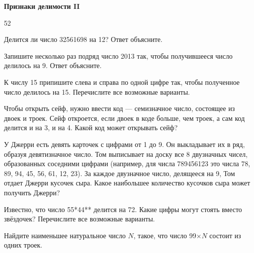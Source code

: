 \centerline{\bf \Huge Признаки делимости II}

\begin{flushright}
        \scriptsize{52}
\end{flushright}

 Делится ли число 32561698 на 12? Ответ объясните.

 Запишите несколько раз подряд число 2013 так, чтобы получившееся число делилось на 9. Ответ объясните.

 К числу 15 припишите слева и справа по одной цифре так, чтобы полученное число делилось на 15. Перечислите все возможные варианты.

 Чтобы открыть сейф, нужно ввести код — семизначное число, состоящее из двоек и троек.
Сейф откроется, если двоек в коде больше, чем троек, а сам код делится и на 3, и на 4. Какой
код может открывать сейф?

 У Джерри есть девять карточек с цифрами от 1 до 9. Он выкладывает их в ряд, образуя девятизначное число. Том выписывает на доску все 8 двузначных
чисел, образованных соседними цифрами (например, для числа 789456123 это числа 78, 89, 94,
45, 56, 61, 12, 23). За каждое двузначное число, делящееся на 9, Том отдает Джерри кусочек
сыра. Какое наибольшее количество кусочков сыра может получить Джерри?

 Известно, что число 55*44** делится на 72. Какие цифры могут стоять вместо звёздочек? Перечислите все возможные варианты.

 Найдите наименьшее натуральное число $N$, такое, что число 99$\times N$ состоит из одних троек.